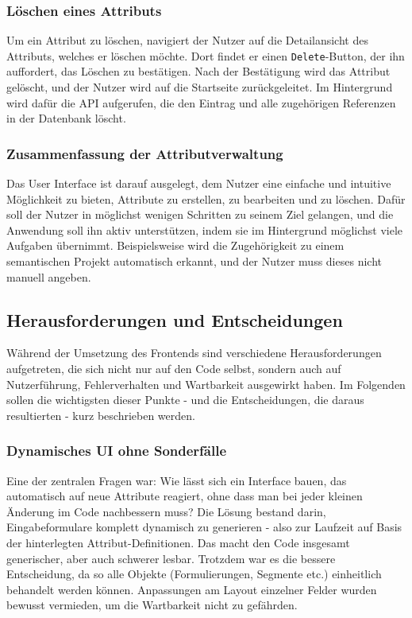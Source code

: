 \subsubsection{Löschen eines Attributs}
Um ein Attribut zu löschen, navigiert der Nutzer auf die Detailansicht des Attributs, welches er löschen möchte. Dort findet er einen \texttt{Delete}-Button,
der ihn auffordert, das Löschen zu bestätigen. Nach der Bestätigung wird das Attribut gelöscht, und der Nutzer wird auf die Startseite zurückgeleitet. Im Hintergrund
wird dafür die API aufgerufen, die den Eintrag und alle zugehörigen Referenzen in der Datenbank löscht.
\subsubsection{Zusammenfassung der Attributverwaltung}
Das User Interface ist darauf ausgelegt, dem Nutzer eine einfache und intuitive Möglichkeit zu bieten, Attribute zu erstellen, zu bearbeiten und zu löschen. 
Dafür soll der Nutzer in möglichst wenigen Schritten zu seinem Ziel gelangen, und die Anwendung soll ihn aktiv unterstützen, indem sie im Hintergrund möglichst 
viele Aufgaben übernimmt. Beispielsweise wird die Zugehörigkeit zu einem semantischen Projekt automatisch erkannt, und der Nutzer muss dieses nicht manuell angeben.
\subsection{Herausforderungen und Entscheidungen}

Während der Umsetzung des Frontends sind verschiedene Herausforderungen aufgetreten, die sich nicht nur auf den Code selbst, sondern auch auf Nutzerführung, Fehlerverhalten und Wartbarkeit ausgewirkt haben. Im Folgenden sollen die wichtigsten dieser Punkte - und die Entscheidungen, die daraus resultierten - kurz beschrieben werden.

\subsubsection*{Dynamisches UI ohne Sonderfälle}
Eine der zentralen Fragen war: Wie lässt sich ein Interface bauen, das automatisch auf neue Attribute reagiert, ohne dass man bei jeder kleinen Änderung im Code 
nachbessern muss? Die Lösung bestand darin, Eingabeformulare komplett dynamisch zu generieren - also zur Laufzeit auf Basis der hinterlegten Attribut-Definitionen.  
Das macht den Code insgesamt generischer, aber auch schwerer lesbar. Trotzdem war es die bessere Entscheidung, da so alle Objekte (Formulierungen, Segmente etc.)
 einheitlich behandelt werden können. Anpassungen am Layout einzelner Felder wurden bewusst vermieden, um die Wartbarkeit nicht zu gefährden.

